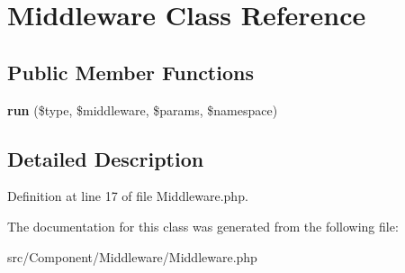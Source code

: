 \hypertarget{class_zest_1_1_component_1_1_middleware_1_1_middleware}{}\section{Middleware Class Reference}
\label{class_zest_1_1_component_1_1_middleware_1_1_middleware}
\subsection*{Public Member Functions}
\begin{DoxyCompactItemize}
\item 
\mbox{\label{class_zest_1_1_component_1_1_middleware_1_1_middleware_a4d10785c9e2b49a5cb67049279d64c78}} 
{\bfseries run} (\$type, \$middleware, \$params, \$namespace)
\end{DoxyCompactItemize}


\subsection{Detailed Description}


Definition at line 17 of file Middleware.\+php.



The documentation for this class was generated from the following file\+:\begin{DoxyCompactItemize}
\item 
src/\+Component/\+Middleware/Middleware.\+php\end{DoxyCompactItemize}
